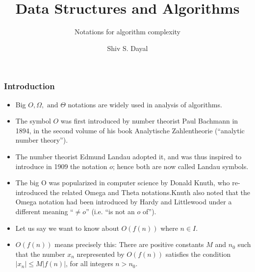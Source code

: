 \documentclass[aspectratio=1610]{beamer}
\begin{document}
\begin{frame}
\title{Data Structures and Algorithms}
\subtitle{Notations for algorithm complexity}
\author{Shiv S. Dayal}
\titlepage
\end{frame}

\begin{frame}
\frametitle{Introduction}
\begin{itemize}
\item Big $O, \Omega, \text{ and } \Theta$ notations are widely used in analysis of
algorithms.

\item The symbol $O$ was first introduced by number theorist Paul Bachmann in 1894,
in the second volume of his book Analytische Zahlentheorie (``analytic number
theory'').

\item The number theorist Edmund Landau adopted it, and was thus inspired to
introduce in 1909 the notation $o$; hence both are now called Landau symbols.

\item The big O was popularized in computer science by Donald Knuth, who
re-introduced the related Omega and Theta notations.Knuth also noted that
the Omega notation had been introduced by Hardy and Littlewood under a
different meaning ``$\ne o$'' (i.e. ``is not an $o$ of'').
\item Let us say we want to know about $O(f(n))$ where $n\in I.$
\item $O(f(n))$ means precisely this: There are positive constants $M$ and
$n_0$ such that the number $x_n$ nrepresented by $O(f(n))$ satisfies the
condition $|x_n| \le M|f(n)|$, for all integers $n > n_0$.
\end{itemize}
\end{frame}
\end{document}
